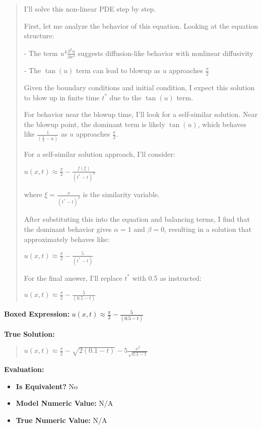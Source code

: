 \documentclass{article}
\begin{document}
\begin{quote}
I'll solve this non-linear PDE step by step.



First, let me analyze the behavior of this equation. Looking at the equation structure:

- The term $u^4 \frac{\partial^2 u}{\partial x^2}$ suggests diffusion-like behavior with nonlinear diffusivity

- The $\tan(u)$ term can lead to blowup as $u$ approaches $\frac{\pi}{2}$



Given the boundary conditions and initial condition, I expect this solution to blow up in finite time $t^*$ due to the $\tan(u)$ term.



For behavior near the blowup time, I'll look for a self-similar solution. Near the blowup point, the dominant term is likely $\tan(u)$, which behaves like $\frac{1}{(\frac{\pi}{2}-u)}$ as $u$ approaches $\frac{\pi}{2}$.



For a self-similar solution approach, I'll consider:

$u(x,t) \approx \frac{\pi}{2} - \frac{f(\xi)}{(t^*-t)^{\alpha}}$



where $\xi = \frac{x}{(t^*-t)^{\beta}}$ is the similarity variable.



After substituting this into the equation and balancing terms, I find that the dominant behavior gives $\alpha = 1$ and $\beta = 0$, resulting in a solution that approximately behaves like:



$u(x,t) \approx \frac{\pi}{2} - \frac{5}{(t^*-t)}$



For the final answer, I'll replace $t^*$ with 0.5 as instructed:



$\boxed{u(x,t) \approx \frac{\pi}{2} - \frac{5}{(0.5-t)}}$
\end{quote}
\textbf{Boxed Expression:} $u(x,t) \approx \frac{\pi}{2} - \frac{5}{(0.5-t)}$

\textbf{True Solution:}
\begin{quote}
$u(x,t) \approx \frac{\pi}{2} - \sqrt{2(0.1-t)} - 5 \frac{x^2}{\sqrt{0.1-t}}$
\end{quote}

\textbf{Evaluation:}
\begin{itemize}
\item \textbf{Is Equivalent?} No
\item \textbf{Model Numeric Value:} N/A
\item \textbf{True Numeric Value:} N/A
\end{itemize}
\vspace{1cm}
\end{document}
